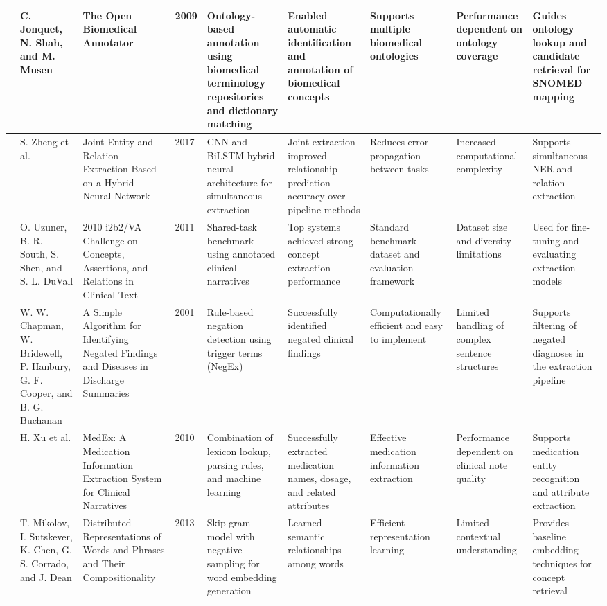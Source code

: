 \begin{landscape}
\begin{singlespace}
\begin{longtable}{|p{0.8cm}|p{1.8cm}|p{3.2cm}|p{0.8cm}|p{3.6cm}|p{3.6cm}|p{2.5cm}|p{2.5cm}|p{3.2cm}|}
\hline
\cite{ref12} & C. Jonquet, N. Shah, and M. Musen & The Open Biomedical Annotator & 2009 & Ontology-based annotation using biomedical terminology repositories and dictionary matching & Enabled automatic identification and annotation of biomedical concepts & Supports multiple biomedical ontologies & Performance dependent on ontology coverage & Guides ontology lookup and candidate retrieval for SNOMED mapping \\
\hline
\cite{ref13} & S. Zheng et al. & Joint Entity and Relation Extraction Based on a Hybrid Neural Network & 2017 & CNN and BiLSTM hybrid neural architecture for simultaneous extraction & Joint extraction improved relationship prediction accuracy over pipeline methods & Reduces error propagation between tasks & Increased computational complexity & Supports simultaneous NER and relation extraction \\
\hline
\cite{ref14} & O. Uzuner, B. R. South, S. Shen, and S. L. DuVall & 2010 i2b2/VA Challenge on Concepts, Assertions, and Relations in Clinical Text & 2011 & Shared-task benchmark using annotated clinical narratives & Top systems achieved strong concept extraction performance & Standard benchmark dataset and evaluation framework & Dataset size and diversity limitations & Used for fine-tuning and evaluating extraction models \\
\hline
\cite{ref15} & W. W. Chapman, W. Bridewell, P. Hanbury, G. F. Cooper, and B. G. Buchanan & A Simple Algorithm for Identifying Negated Findings and Diseases in Discharge Summaries & 2001 & Rule-based negation detection using trigger terms (NegEx) & Successfully identified negated clinical findings & Computationally efficient and easy to implement & Limited handling of complex sentence structures & Supports filtering of negated diagnoses in the extraction pipeline \\
\hline
\cite{ref16} & H. Xu et al. & MedEx: A Medication Information Extraction System for Clinical Narratives & 2010 & Combination of lexicon lookup, parsing rules, and machine learning & Successfully extracted medication names, dosage, and related attributes & Effective medication information extraction & Performance dependent on clinical note quality & Supports medication entity recognition and attribute extraction \\
\hline
\cite{ref17} & T. Mikolov, I. Sutskever, K. Chen, G. S. Corrado, and J. Dean & Distributed Representations of Words and Phrases and Their Compositionality & 2013 & Skip-gram model with negative sampling for word embedding generation & Learned semantic relationships among words & Efficient representation learning & Limited contextual understanding & Provides baseline embedding techniques for concept retrieval \\

\end{longtable}
\end{singlespace}
\end{landscape}
